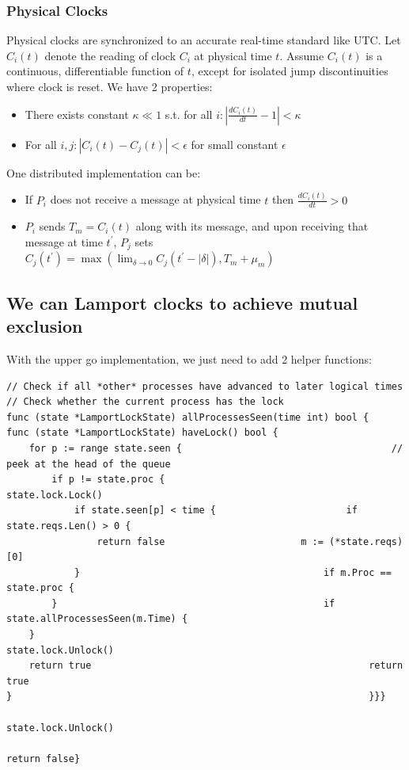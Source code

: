 \documentclass[acmlarge]{acmart}
\begin{document}
\subsubsection{Physical Clocks}
Physical clocks are synchronized to an accurate real-time standard like UTC. Let $C_{i}(t)$ denote the reading of clock $C_{i}$ at physical time $t$. Assume $C_{i}(t)$ is a continuous, differentiable function of $t$, except for isolated jump discontinuities where clock is reset. We have 2 properties:
\begin{itemize}
  \item There exists constant $\kappa \ll 1$ s.t. for all $i:\left|\frac{d C_{i}(t)}{d t}-1\right|<\kappa$
  \item For all $i, j:\left|C_{i}(t)-C_{j}(t)\right|<\epsilon$ for small constant $\epsilon$
\end{itemize}

One distributed implementation can be:
\begin{itemize}
  \item If $P_{i}$ does not receive a message at physical time $t$ then $\frac{d C_{i}(t)}{d t}>0$
  \item $P_{i}$ sends $T_{m}=C_{i}(t)$ along with its message, and upon receiving that message at time $t^{\prime}$,
        $P_{j}$ sets $C_{j}\left(t^{\prime}\right)=\max \left(\lim _{\delta \rightarrow 0} C_{j}\left(t^{\prime}-|\delta|\right), T_{m}+\mu_{m}\right)$
\end{itemize}

\subsection{We can Lamport clocks to achieve mutual exclusion}
With the upper go implementation, we just need to add 2 helper functions:
\begin{lstlisting}
// Check if all *other* processes have advanced to later logical times // Check whether the current process has the lock     
func (state *LamportLockState) allProcessesSeen(time int) bool {       func (state *LamportLockState) haveLock() bool {     
	for p := range state.seen {                                 	// peek at the head of the queue                           
		if p != state.proc {                                  	state.lock.Lock()                       
			if state.seen[p] < time {                     	if state.reqs.Len() > 0 {                             
				return false                      	m := (*state.reqs)[0]        
			}                                   		if m.Proc == state.proc {     
		}                                   			if state.allProcessesSeen(m.Time) {
	}                                  	                    	state.lock.Unlock() 
	return true                        	                    	return true               
}                                                      			}}}
                                                               		state.lock.Unlock()
                                                               		return false}
\end{lstlisting}
\end{document}
